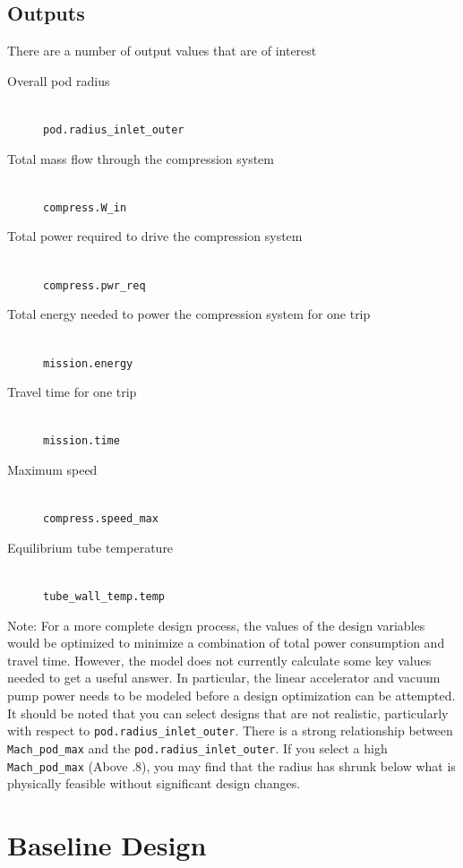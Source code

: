 \documentclass[heading.tex]{subfiles}
\begin{document}
\subsection{Outputs}
There are a number of output values that are of interest

\begin{description}
  \item[Overall pod radius] \hfill \\
  \texttt{pod.radius\_inlet\_outer}
  \item[Total mass flow through the compression system] \hfill \\
  \texttt{compress.W\_in}
  \item[Total power required to drive the compression system] \hfill \\
  \texttt{compress.pwr\_req}
  \item[Total energy needed to power the compression system for one trip] \hfill \\
  \texttt{mission.energy}
  \item[Travel time for one trip] \hfill \\
  \texttt{mission.time}
  \item[Maximum speed] \hfill \\
  \texttt{compress.speed\_max}
  \item[Equilibrium tube temperature] \hfill \\
  \texttt{tube\_wall\_temp.temp}
\end{description}

Note: For a more complete design process, the values of the design variables would be optimized to minimize a combination of total power consumption and travel time. However, the model does not currently calculate some key values needed to get a useful answer. In particular, the linear accelerator and vacuum pump power needs to be modeled before a design optimization can be attempted.
It should be noted that you can select designs that are not realistic, particularly with respect to \texttt{pod.radius\_inlet\_outer}. There is a strong relationship between \texttt{Mach\_pod\_max} and the \texttt{pod.radius\_inlet\_outer}. If you select a high \texttt{Mach\_pod\_max} (Above .8), you may find that the radius has shrunk below what is physically feasible without significant design changes.

\section{Baseline Design}
\end{document}
